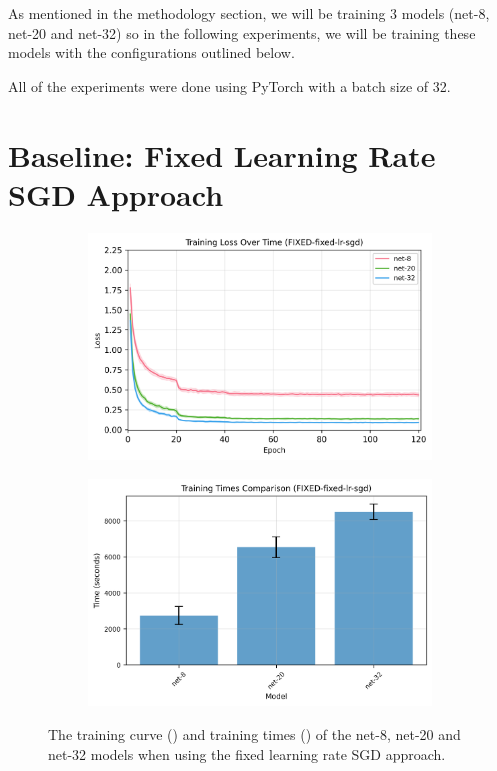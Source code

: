 \documentclass[logo,bsc,singlespacing,parskip,online]{infthesis}
\begin{document}
As mentioned in the methodology section, we will be training 3 models 
(net-8, net-20 and net-32) so in the following experiments, we will 
be training these models with the configurations outlined below.

All of the experiments were done using PyTorch with a batch size of 32.

\section{Baseline: Fixed Learning Rate SGD Approach}
\begin{figure}[h]
   \centering
   \begin{subfigure}[b]{0.45\textwidth}
      \centering
      \includegraphics[width=\textwidth]{FIXED-fixed-lr-sgd_training_losses.png}  
      \caption{}
      \label{fig:fixed-lr-sgd-losses}
   \end{subfigure}
   \begin{subfigure}[b]{0.45\textwidth}
      \centering
      \includegraphics[width=\textwidth]{FIXED-fixed-lr-sgd_training_times.png}
      \caption{}
      \label{fig:fixed-lr-sgd-times}
   \end{subfigure}
   \caption{The training curve () and training times () of the net-8, net-20 and net-32 models when using the fixed learning rate SGD approach.}
   \label{fig:training-curves}
\end{figure}
\end{document}
